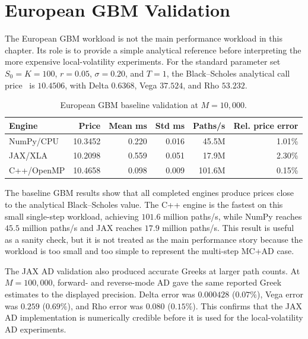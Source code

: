 \section{European GBM Validation}
\label{sec:results-gbm-validation}

The European GBM workload is not the main performance workload in this
chapter.  Its role is to provide a simple analytical reference before
interpreting the more expensive local-volatility experiments.  For the
standard parameter set \(S_0=K=100\), \(r=0.05\), \(\sigma=0.20\), and
\(T=1\), the Black--Scholes analytical call price~\cite{blackscholes1973}
is \(10.4506\), with
Delta \(0.6368\), Vega \(37.524\), and Rho \(53.232\).

\begin{table}[htbp]
\centering
\small
\caption{European GBM baseline validation at \(M=10{,}000\).}
\label{tab:gbm-baseline-validation}
\begin{tabular}{lrrrrr}
\toprule
\textbf{Engine} & \textbf{Price} & \textbf{Mean ms} & \textbf{Std ms}
& \textbf{Paths/s} & \textbf{Rel. price error} \\
\midrule
NumPy/CPU   & 10.3452 & 0.220 & 0.016 & 45.5M  & 1.01\% \\
JAX/XLA     & 10.2098 & 0.559 & 0.051 & 17.9M  & 2.30\% \\
C++/OpenMP  & 10.4658 & 0.098 & 0.009 & 101.6M & 0.15\% \\
\bottomrule
\end{tabular}
\end{table}

The baseline GBM results show that all completed engines produce prices close
to the analytical Black--Scholes value.  The C++ engine is the fastest on
this small single-step workload, achieving \(101.6\) million paths/s, while
NumPy reaches \(45.5\) million paths/s and JAX reaches \(17.9\) million
paths/s.  This result is useful as a sanity check, but it is not treated as
the main performance story because the workload is too small and too simple
to represent the multi-step MC+AD case.

The JAX AD validation also produced accurate Greeks at larger path counts.
At \(M=100{,}000\), forward- and reverse-mode AD gave the same reported
Greek estimates to the displayed precision.  Delta error was \(0.000428\)
(\(0.07\%\)), Vega error was \(0.259\) (\(0.69\%\)), and Rho error was
\(0.080\) (\(0.15\%\)).  This confirms that the JAX AD implementation is
numerically credible before it is used for the local-volatility AD
experiments.

